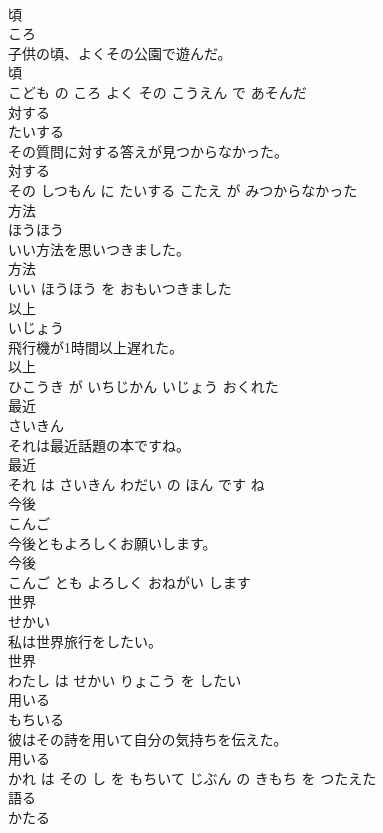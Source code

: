 \documentclass[8pt]{extreport}
\begin{document}
\begin{CJK}{UTF8}{min}
\\	頃	
\\	ころ			
\\	子供の頃、よくその公園で遊んだ。	
\\	頃 
\\	こども の ころ よく その こうえん で あそんだ			
\\	対する	
\\	たいする			
\\	その質問に対する答えが見つからなかった。	
\\	対する 
\\	その しつもん に たいする こたえ が みつからなかった			
\\	方法	
\\	ほうほう			
\\	いい方法を思いつきました。	
\\	方法 
\\	いい ほうほう を おもいつきました			
\\	以上	
\\	いじょう			
\\	飛行機が1時間以上遅れた。	
\\	以上 
\\	ひこうき が いちじかん いじょう おくれた			
\\	最近	
\\	さいきん			
\\	それは最近話題の本ですね。	
\\	最近 
\\	それ は さいきん わだい の ほん です ね			
\\	今後	
\\	こんご			
\\	今後ともよろしくお願いします。	
\\	今後 
\\	こんご とも よろしく おねがい します			
\\	世界	
\\	せかい			
\\	私は世界旅行をしたい。	
\\	世界 
\\	わたし は せかい りょこう を したい			
\\	用いる	
\\	もちいる			
\\	彼はその詩を用いて自分の気持ちを伝えた。	
\\	用いる 
\\	かれ は その し を もちいて じぶん の きもち を つたえた			
\\	語る	
\\	かたる			

\end{CJK}
\end{document}
